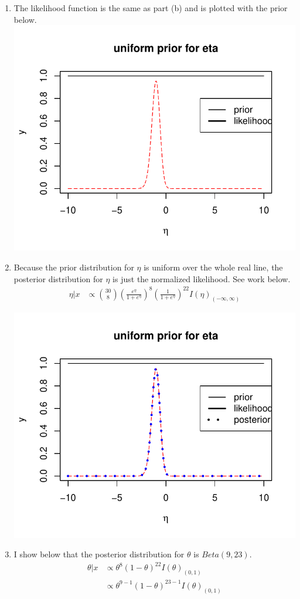 \documentclass[12pt]{article}\usepackage[]{graphicx}\usepackage[]{color}
\newenvironment{knitrout}{}{} %
\begin{document}
\begin{doublespacing}
\begin{enumerate}
\begin{enumerate}
\begin{enumerate}
\item The likelihood function is the same as part (b) and is plotted with the prior below.
\begin{knitrout}\footnotesize
{}\color{fgcolor}
\includegraphics[width=.5\linewidth]{figure/etauniformlike-1} 

\end{knitrout}

\item Because the prior distribution for $\eta$ is uniform over the whole real line, the posterior distribution for $\eta$ is just the normalized likelihood. See work below.
\begin{align*}
\eta|x &\propto {30 \choose 8}(\frac{e^{\eta}}{1+e^{\eta}})^8(\frac{1}{1+e^{\eta}})^{22}I(\eta)_{(-\infty,\infty)} 
\end{align*}


\begin{knitrout}\footnotesize
{}\color{fgcolor}
\includegraphics[width=.5\linewidth]{figure/etauniform-1} 

\end{knitrout}

\item I show below that the posterior distribution for $\theta$ is $Beta(9, 23)$. 
\begin{align*}
\theta|x &\propto \theta^8(1-\theta)^{22}I(\theta)_{(0,1)} \\
&\propto \theta^{9-1}(1-\theta)^{23-1}I(\theta)_{(0,1)} 
\end{align*}


\end{enumerate}
\end{enumerate}
\end{enumerate}
\end{doublespacing}
\end{document}
